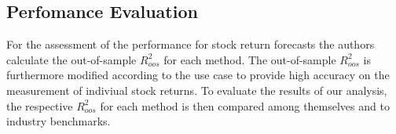 \subsection{Perfomance Evaluation}
For the assessment of the performance for stock return forecasts the authors calculate the out-of-sample $R^{2}_{oos}$ for each method.
The out-of-sample $R^{2}_{oos}$ is furthermore modified according to the use case to provide high accuracy on the measurement of indiviual stock returns.
To evaluate the results of our analysis, the respective $R^{2}_{oos}$ for each method is then compared among themselves and to industry benchmarks.
